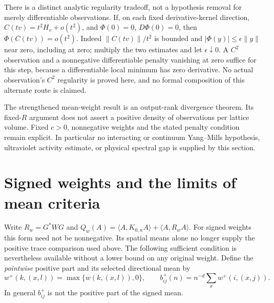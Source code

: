 \documentclass[11pt]{article}
\newcommand{\ip}[2]{\langle #1,#2\rangle}
\begin{document}
There is a distinct analytic regularity tradeoff, not a hypothesis removal
for merely differentiable observations. If, on each fixed derivative-kernel
direction, $C(tv)=t^2H_v+o(t^2)$, and $\Phi(0)=0$, $D\Phi(0)=0$, then
$\Phi(C(tv))=o(t^2)$. Indeed $\|C(tv)\|/t^2$ is bounded and
$|\Phi(y)|\leq\epsilon\|y\|$ near zero, including at zero; multiply the
two estimates and let $\epsilon\downarrow0$. A $C^2$ observation and a
nonnegative differentiable penalty vanishing at zero suffice for this
step, because a differentiable local minimum has zero derivative.
No actual observation's $C^2$ regularity is proved here, and no formal
composition of this alternate route is claimed.

The strengthened mean-weight result is an output-rank divergence theorem.
Its fixed-$R$ argument does not assert a positive density of observations
per lattice volume. Fixed $c>0$, nonnegative weights and the stated
penalty condition remain explicit. In particular no interacting or
continuum Yang--Mills hypothesis, ultraviolet activity estimate, or
physical spectral gap is supplied by this section.

\section{Signed weights and the limits of mean criteria}\label{sec:signed}
Write $R_w=G^*W G$ and $Q_w(A)=\ip{A}{K_{0,n}A}+\ip{A}{R_wA}$.
For signed weights this form need not be nonnegative. Its spatial means
alone no longer supply the positive trace comparison used above.
The following sufficient condition is nevertheless available without a
lower bound on any original weight. Define the \emph{pointwise} positive part
and its selected directional mean by
\[
 w^+(k,(x,l))=\max\{w(k,(x,l)),0\},\qquad
 b^+_{ij}(n)=n^{-d}\sum_x w^+(i,(x,j)).
\]
In general $b^+_{ij}$ is not the positive part of the signed mean.
\end{document}
